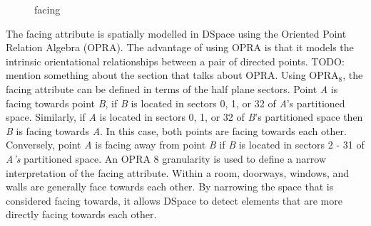 \documentclass[12pt]{ucthesis}
\begin{document}
\begin{figure}[H]
 \centering
 \hspace{10 mm}
  \hspace{10 mm}
 \hspace{10 mm}
 \caption{facing}
\label{display-arrangement}
\end{figure}

The facing attribute is spatially modelled in DSpace using the Oriented Point Relation Algebra \cite{Moratz} (OPRA). The advantage of using OPRA is that it models the intrinsic orientational relationships between a pair of directed points. TODO: mention something about the section that talks about OPRA. Using OPRA$_{8}$, the facing attribute can be defined in terms of the half plane sectors. Point \emph{A} is facing towards point \emph{B}, if \emph{B} is located in sectors 0, 1, or 32 of \emph{A}'s partitioned space. Similarly, if \emph{A} is located in sectors 0, 1, or 32 of \emph{B}'s partitioned space then \emph{B} is facing towards \emph{A}. In this case, both points are facing towards each other. Conversely, point \emph{A} is facing away from point \emph{B} if \emph{B} is located in sectors 2 - 31 of \emph{A's} partitioned space. An OPRA 8 granularity is used to define a narrow interpretation of the facing attribute. Within a room, doorways, windows, and walls are generally face towards each other. By narrowing the space that is considered facing towards, it allows DSpace to detect elements that are more directly facing towards each other.
\end{document}

